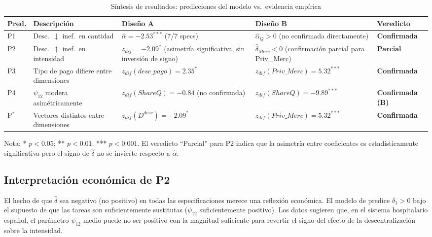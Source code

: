\documentclass[12pt, a4paper]{article}
\begin{document}
\begin{table}[h!]
\centering
\caption{Síntesis de resultados: predicciones del
modelo vs.\ evidencia empírica}
\label{tab:sintesis}
\begin{threeparttable}
\begin{tabular}{p{0.8cm}p{4cm}p{3cm}p{3cm}p{1.5cm}}
\toprule
\textbf{Pred.} & \textbf{Descripción} &
\textbf{Diseño A} & \textbf{Diseño B} &
\textbf{Veredicto} \\
\midrule
P1 & Desc.\ $\downarrow$ inef.\ en cantidad
  & $\hat{\alpha}=-2.53^{***}$ (7/7 specs)
  & $\hat{\alpha}_Q > 0$ (no confirmada directamente)
  & \textbf{Confirmada} \\[6pt]
P2 & Desc.\ $\uparrow$ inef.\ en intensidad
  & $z_{dif}=-2.09^{*}$ (asimetría significativa, sin inversión de signo)
  & $\hat{\delta}_{Merc}<0$ (confirmación parcial para Priv\_Merc)
  & \textbf{Parcial} \\[6pt]
P3 & Tipo de pago difiere entre dimensiones
  & $z_{dif}(desc\_pago)=2.35^{*}$
  & $z_{dif}(Priv\_Merc)=5.32^{***}$
  & \textbf{Confirmada} \\[6pt]
P4 & $\psi_{12}$ modera asimétricamente
  & $z_{dif}(ShareQ)=-0.84$ (no confirmada)
  & $z_{dif}(ShareQ)=-9.89^{***}$
  & \textbf{Confirmada (B)} \\[6pt]
P$^*$ & Vectores distintos entre dimensiones
  & $z_{dif}(D^{desc})=-2.09^{*}$
  & $z_{dif}(Priv\_Merc)=5.32^{***}$
  & \textbf{Confirmada} \\
\bottomrule
\end{tabular}
\begin{tablenotes}
  \small
  \item Nota: * $p<0.05$; ** $p<0.01$; *** $p<0.001$.
    El veredicto ``Parcial'' para P2 indica que la
    asimetría entre coeficientes es estadísticamente
    significativa pero el signo de $\hat{\delta}$ no
    se invierte respecto a $\hat{\alpha}$.
\end{tablenotes}
\end{threeparttable}
\end{table}

\subsection{Interpretación económica de P2}

El hecho de que $\hat{\delta}$ sea negativo (no positivo)
en todas las especificaciones merece una reflexión
económica. El modelo de \citet{izquierdo2019} predice
$\delta_1 > 0$ bajo el supuesto de que las tareas son
suficientemente sustitutas ($\psi_{12}$ suficientemente
positivo). Los datos sugieren que, en el sistema
hospitalario español, el parámetro $\psi_{12}$ medio
puede no ser positivo con la magnitud suficiente para
revertir el signo del efecto de la descentralización
sobre la intensidad.
\end{document}
